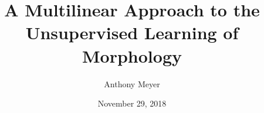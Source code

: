\documentclass[showabstract,showacknowledgments,showpreface,showdedication]{iuphd}
\title{A Multilinear Approach to the Unsupervised Learning of Morphology}
\author{Anthony Meyer}
\date{November 29, 2018}
\theoremstyle{remark}
\theoremstyle{remark}
\theoremstyle{remark}
\theoremstyle{remark}
\begin{document}
\maketitle



 
 

\acceptancepage

\copyrightpage 
\end{document}
